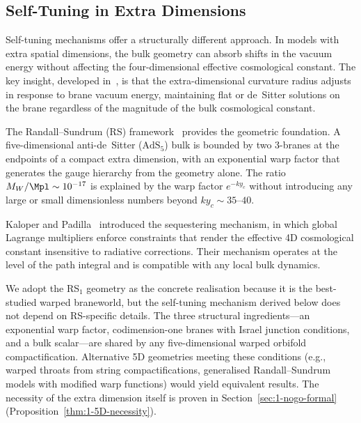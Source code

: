 \subsection{Self-Tuning in Extra Dimensions}
\label{sec:1-self-tuning}

Self-tuning mechanisms offer a structurally different approach. In models with extra spatial dimensions, the bulk geometry can absorb shifts in the vacuum energy without affecting the four-dimensional effective cosmological constant. The key insight, developed in~\cite{ch1:arkani00,ch1:kachru00,ch1:carroll03}, is that the extra-dimensional curvature radius adjusts in response to brane vacuum energy, maintaining flat or de~Sitter solutions on the brane regardless of the magnitude of the bulk cosmological constant.

The Randall--Sundrum (RS) framework~\cite{ch1:rs1,ch1:rs2} provides the geometric foundation. A five-dimensional anti-de~Sitter ($\mathrm{AdS}_5$) bulk is bounded by two 3-branes at the endpoints of a compact extra dimension, with an exponential warp factor that generates the gauge hierarchy from the geometry alone. The ratio $M_W/\Mpl \sim 10^{-17}$ is explained by the warp factor $e^{-ky_c}$ without introducing any large or small dimensionless numbers beyond $ky_c \sim 35$--$40$.

Kaloper and Padilla~\cite{ch1:kaloper14} introduced the sequestering mechanism, in which global Lagrange multipliers enforce constraints that render the effective 4D cosmological constant insensitive to radiative corrections. Their mechanism operates at the level of the path integral and is compatible with any local bulk dynamics.

We adopt the RS$_1$ geometry as the concrete realisation because it is the best-studied warped braneworld, but the self-tuning mechanism derived below does not depend on RS-specific details. The three structural ingredients---an exponential warp factor, codimension-one branes with Israel junction conditions, and a bulk scalar---are shared by any five-dimensional warped orbifold compactification. Alternative 5D geometries meeting these conditions (e.g., warped throats from string compactifications, generalised Randall--Sundrum models with modified warp functions) would yield equivalent results. The necessity of the extra dimension itself is proven in Section~\ref{sec:1-nogo-formal} (Proposition~\ref{thm:1-5D-necessity}).


